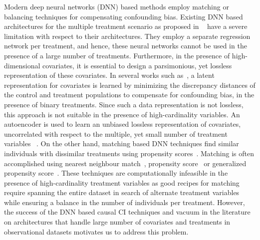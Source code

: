 \documentclass[twoside,11pt]{article}
\begin{document}
Modern deep neural networks (DNN) based methods employ matching or balancing techniques for compensating confounding bias. Existing DNN based architectures for the multiple treatment scenario as proposed in ~\citep{esann-multiMBNN,schwab2018perfect} have a severe limitation with respect to their architectures. They employ a  separate regression network per treatment, and hence, these neural networks cannot be used in the presence of a large number of treatments. Furthermore, in the presence of high-dimensional covariates, it is essential to design a parsimonious, yet lossless representation of these covariates. In several works such as~\citep{johansson2016learning,pmlr-v70-shalit17a}, a latent representation for covariates is learned by minimizing the discrepancy distances of the control and treatment populations to compensate for confounding bias, in the presence of binary treatments. Since such a data representation is not lossless, this approach is not suitable in the presence of high-cardinality variables. An autoencoder is used to learn an unbiased lossless representation of covariates, uncorrelated with respect to the multiple, yet small number of treatment variables ~\citep{atan2018deep,zhang2019reducing}. On the other hand, matching based DNN techniques find similar individuals with dissimilar treatments using propensity scores~\citep{schwab2018perfect,esann-multiMBNN,ho2007matching}. Matching is often accomplished using nearest neighbour match~\citep{ho2007matching}, propensity score~\citep{schwab2018perfect} or generalized propensity score~\citep{esann-multiMBNN}. These techniques are computationally infeasible in the presence of high-cardinality treatment variables as good recipes for matching require spanning the entire dataset in search of alternate treatment variables while ensuring a balance in the number of individuals per treatment. However, the success of the DNN based causal CI techniques and vacuum in the literature on architectures that handle large number of covariates and treatments in observational datasets motivates us to address this problem. 
\end{document}
